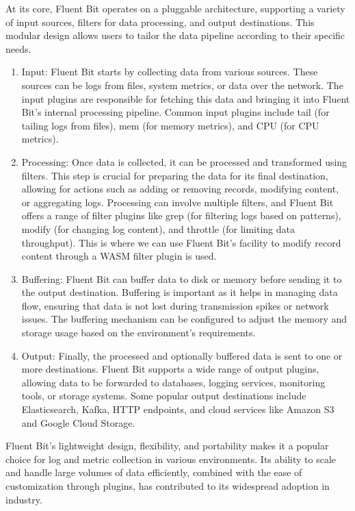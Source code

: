 At its core, Fluent Bit operates on a pluggable architecture, supporting a variety of input sources, filters for data processing, and output destinations. This modular design allows users to tailor the data pipeline according to their specific needs.
\begin{enumerate}
    \item Input: Fluent Bit starts by collecting data from various sources. These sources can be logs from files, system metrics, or data over the network. The input plugins are responsible for fetching this data and bringing it into Fluent Bit's internal processing pipeline. Common input plugins include tail (for tailing logs from files), mem (for memory metrics), and CPU (for CPU metrics).
    \item Processing: Once data is collected, it can be processed and transformed using filters. This step is crucial for preparing the data for its final destination, allowing for actions such as adding or removing records, modifying content, or aggregating logs. Processing can involve multiple filters, and Fluent Bit offers a range of filter plugins like grep (for filtering logs based on patterns), modify (for changing log content), and throttle (for limiting data throughput). This is where we can use Fluent Bit's facility to modify record content through a WASM filter plugin is used.
    \item Buffering: Fluent Bit can buffer data to disk or memory before sending it to the output destination. Buffering is important as it helps in managing data flow, ensuring that data is not lost during transmission spikes or network issues. The buffering mechanism can be configured to adjust the memory and storage usage based on the environment's requirements.
    \item Output: Finally, the processed and optionally buffered data is sent to one or more destinations. Fluent Bit supports a wide range of output plugins, allowing data to be forwarded to databases, logging services, monitoring tools, or storage systems. Some popular output destinations include Elasticsearch, Kafka, HTTP endpoints, and cloud services like Amazon S3 and Google Cloud Storage.
\end{enumerate}
Fluent Bit's lightweight design, flexibility, and portability makes it a popular choice for log and metric collection in various environments. Its ability to scale and handle large volumes of data efficiently, combined with the ease of customization through plugins, has contributed to its widespread adoption in industry.

